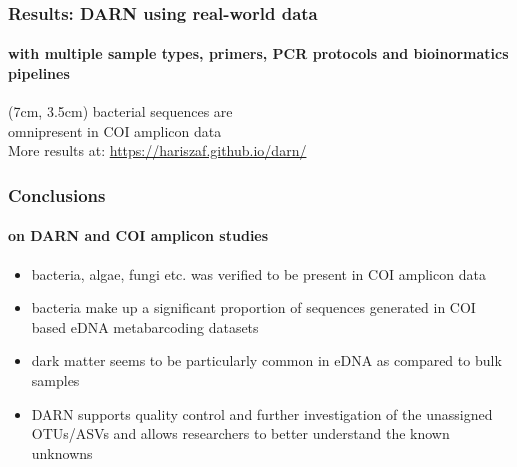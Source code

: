 \documentclass{beamer}
\begin{document}
   \begin{frame}
      \frametitle{Results: DARN using real-world data}
      \framesubtitle{with multiple sample types, primers, PCR protocols and bioinormatics pipelines}


      \begin{textblock*}{6cm}(7cm, 3.5cm)
         bacterial sequences are \\ 
         omnipresent in COI amplicon data \\
         \bigskip
         More results at:
         \href{https://hariszaf.github.io/darn/}{https://hariszaf.github.io/darn/} \\
      \end{textblock*}

   \end{frame}


   \begin{frame}
      \frametitle{Conclusions}
      \framesubtitle{on DARN and COI amplicon studies}
      \begin{itemize}
         \item \small bacteria, algae, fungi etc. was verified to be present in COI amplicon data
         \item \small bacteria make up a significant proportion of sequences generated in COI based eDNA metabarcoding datasets
         \item \small dark matter seems to be particularly common in eDNA as compared to bulk samples
         \item \small DARN supports quality control and further investigation of the unassigned OTUs/ASVs and
               \small allows researchers to better understand the known unknowns
      \end{itemize}
   \end{frame}
\end{document}
